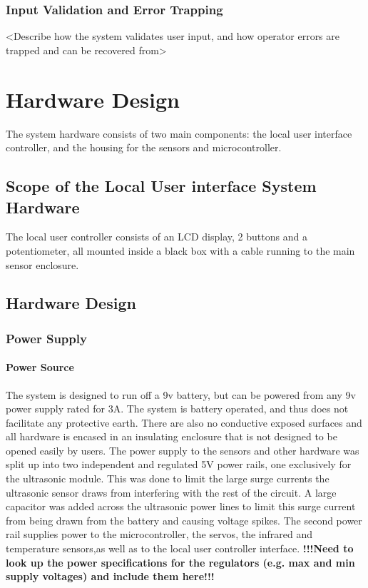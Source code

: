\documentclass[]{report}
\begin{document}
\subsection{Input Validation and Error Trapping}
<Describe how the system validates user input, and how operator errors are trapped and can be recovered from>

\chapter{Hardware Design}
The system hardware consists of two main components: the local user interface controller, and the housing for the sensors and microcontroller.

\section{Scope of the Local User interface System Hardware}
The local user controller consists of an LCD display, 2 buttons and a potentiometer, all mounted inside a black box with a cable running to the main sensor enclosure.

\section{Hardware Design}
\subsection{Power Supply}
\subsubsection{Power Source}
The system is designed to run off a 9v battery, but can be powered from any 9v power supply rated for 3A. The system is battery operated, and thus does not facilitate any protective earth. There are also no conductive exposed surfaces and all hardware is encased in an insulating enclosure that is not designed to be opened easily by users. \newline
The power supply to the sensors and other hardware was split up into two independent and regulated 5V power rails, one exclusively for the ultrasonic module. This was done to limit the large surge currents the ultrasonic sensor draws from interfering with the rest of the circuit. A large capacitor was added across the ultrasonic power lines to limit this surge current from being drawn from the battery and causing voltage spikes.\newline
The second power rail supplies power to the microcontroller, the servos, the infrared and temperature sensors,as well as to the local user controller interface.
\textbf{!!!Need to look up the power specifications for the regulators (e.g. max and min supply voltages) and include them here!!!}
\end{document}

